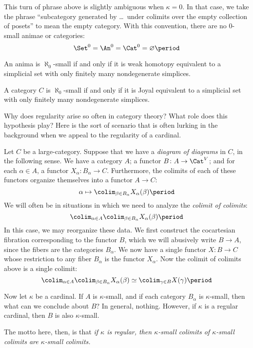 \begin{eg}
	This turn of phrase above is slightly ambiguous when $ \kappa = 0 $.
	In that case, we take the phrase
	\enquote{subcategory generated by \ldots\ under colimits
	over the empty collection of posets}
	to mean the empty category.
	With this convention, there are no $ 0 $-small animae or categories:
	\[ \Set^0 = \An^0 = \Cat^0 = \varnothing \period \]
\end{eg}

\begin{eg}
	An anima is $ \aleph_0 $-small if and only if
	it is weak homotopy equivalent to a simplicial set
	with only finitely many nondegenerate simplices.

	A category $ C $ is $ \aleph_0 $-small if and only if
	it is Joyal equivalent to a simplicial set
	with only finitely many nondegenerate simplices. 
\end{eg}

\begin{eg}
	Why does regularity arise so often in category theory?
	What role does this hypothesis play?
	Here is the sort of scenario that is often
	lurking in the background when we appeal to the
	regularity of a cardinal.

	Let $ C $ be a large-category.
	Suppose that we have a \emph{diagram of diagrams} in $ C $,
	in the following sense.
	We have a category $ A $;
	a functor $ B \colon A \to \Cat^V $;
	and for each $ \alpha \in A $,
	a functor $ X_{\alpha} \colon B_{\alpha} \to C $.
	Furthermore, the colimits of each of these functors
	organize themselves into a functor
	$ A \to C $:
	\[
		\alpha \mapsto \colim_{\beta \in B_{\alpha}}
		X_{\alpha}(\beta) \period
	\]
	We will often be in situations in which
	we need to analyze the \emph{colimit of colimits}:
	\[
		\colim_{\alpha \in A}
		\colim_{\beta \in B_{\alpha}} X_{\alpha}(\beta) \period
	\]
	In this case, we may reorganize these data.
	We first construct the cocartesian fibration
	corresponding to the functor $ B $,
	which we will abusively write $ B \to A $,
	since the fibers are the categories $ B_{\alpha} $.
	We now have a single functor $ X \colon B \to C $
	whose restriction to any fiber $ B_{\alpha} $
	is the functor $ X_{\alpha} $.
	Now the colimit of colimits above is a single colimit:
	\[
		\colim_{\alpha \in A}
		\colim_{\beta \in B_{\alpha}} X_{\alpha}(\beta) \simeq
		\colim_{\gamma \in B} X(\gamma) \period
	\]

	Now let $ \kappa $ be a cardinal.
	If $ A $ is $ \kappa $-small,
	and if each category $ B_{\alpha} $ is $ \kappa $-small,
	then what can we conclude about $ B $?
	In general, nothing.
	However, if $ \kappa $ is a regular cardinal,
	then $ B $ is also $ \kappa $-small.

	The motto here, then, is that
	\emph{%
		if $ \kappa $ is regular,
		then $ \kappa $-small colimits
		of $ \kappa $-small colimits
		are $ \kappa $-small colimits.
	}
\end{eg}

